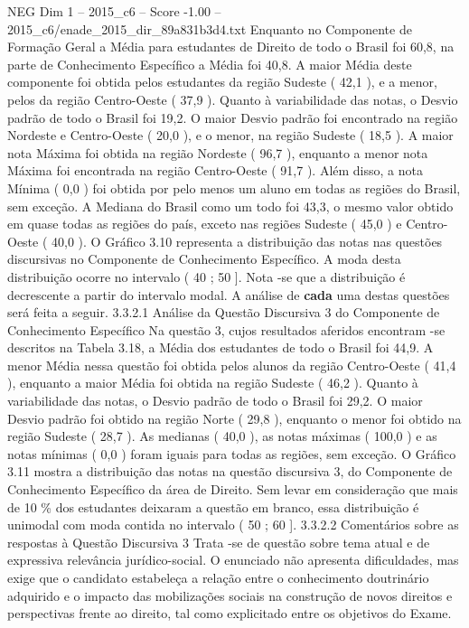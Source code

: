 \begin{textsample}{NEG Dim 1 – 2015\_c6 – Score -1.00 – 2015\_c6/enade\_2015\_dir\_89a831b3d4.txt}
Enquanto no Componente de Formação Geral a Média para estudantes de Direito de todo o Brasil foi 60,8, na parte de Conhecimento Específico a Média foi 40,8.
A maior Média deste componente foi obtida pelos estudantes da região Sudeste ( 42,1 ), e a menor, pelos da região Centro-Oeste ( 37,9 ).
Quanto à variabilidade das notas, o Desvio padrão de todo o Brasil foi 19,2.
O maior Desvio padrão foi encontrado na região Nordeste e Centro-Oeste ( 20,0 ), e o menor, na região Sudeste ( 18,5 ).
A maior nota Máxima foi obtida na região Nordeste ( 96,7 ), enquanto a menor nota Máxima foi encontrada na região Centro-Oeste ( 91,7 ).
Além disso, a nota Mínima ( 0,0 ) foi obtida por pelo menos um aluno em todas as regiões do Brasil, sem exceção.
A Mediana do Brasil como um todo foi 43,3, o mesmo valor obtido em quase todas as regiões do país, exceto nas regiões Sudeste ( 45,0 ) e Centro-Oeste ( 40,0 ).
O Gráfico 3.10 representa a distribuição das notas nas questões discursivas no Componente de Conhecimento Específico.
A moda desta distribuição ocorre no intervalo ( 40 ; 50 ].
Nota -se que a distribuição é decrescente a partir do intervalo modal.
A análise de \textbf{cada} uma destas questões será feita a seguir. 3.3.2.1 Análise da Questão Discursiva 3 do Componente de Conhecimento Específico Na questão 3, cujos resultados aferidos encontram -se descritos na Tabela 3.18, a Média dos estudantes de todo o Brasil foi 44,9.
A menor Média nessa questão foi obtida pelos alunos da região Centro-Oeste ( 41,4 ), enquanto a maior Média foi obtida na região Sudeste ( 46,2 ).
Quanto à variabilidade das notas, o Desvio padrão de todo o Brasil foi 29,2.
O maior Desvio padrão foi obtido na região Norte ( 29,8 ), enquanto o menor foi obtido na região Sudeste ( 28,7 ).
As medianas ( 40,0 ), as notas máximas ( 100,0 ) e as notas mínimas ( 0,0 ) foram iguais para todas as regiões, sem exceção.
O Gráfico 3.11 mostra a distribuição das notas na questão discursiva 3, do Componente de Conhecimento Específico da área de Direito.
Sem levar em consideração que mais de 10 \% dos estudantes deixaram a questão em branco, essa distribuição é unimodal com moda contida no intervalo ( 50 ; 60 ]. 3.3.2.2 Comentários sobre as respostas à Questão Discursiva 3 Trata -se de questão sobre tema atual e de expressiva relevância jurídico-social.
O enunciado não apresenta dificuldades, mas exige que o candidato estabeleça a relação entre o conhecimento doutrinário adquirido e o impacto das mobilizações sociais na construção de novos direitos e perspectivas frente ao direito, tal como explicitado entre os objetivos do Exame.

\end{textsample}
